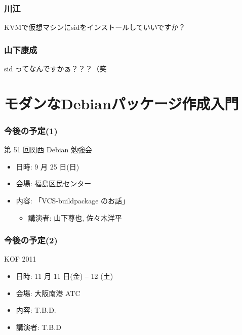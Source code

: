 \documentclass[cjk,dvipdfmx,12pt,%
hyperref={bookmarks=true,bookmarksnumbered=true,bookmarksopen=false,%
colorlinks=false,%
pdftitle={第 50 回 関西 Debian 勉強会},%
pdfauthor={倉敷・のがた・佐々木},%
pdfsubject={資料},%
}]{beamer}
\begin{document}
\begin{frame}[fragile]
\frametitle{ 川江 }
KVMで仮想マシンにsidをインストールしていいですか？
\end{frame}

\begin{frame}[fragile]
\frametitle{ 山下康成 }
sid ってなんですかぁ？？？（笑
\end{frame}



\section{モダンなDebianパッケージ作成入門}


\begin{frame}[fragile]
\frametitle{今後の予定(1)}

\begin{block}{第 51 回関西 Debian 勉強会}
  \begin{itemize}
  \item 日時: 9 月 25 日(日)
  \item 会場: 福島区民センター
  \item 内容: 「VCS-buildpackage のお話」
    \begin{itemize}
    \item 講演者: 山下尊也, 佐々木洋平
    \end{itemize}
  \end{itemize}
\end{block}

\end{frame}

\begin{frame}[fragile]
\frametitle{今後の予定(2)}

\begin{block}{KOF 2011}
  \begin{itemize}
  \item 日時: 11 月 11 日(金) -- 12 (土)
  \item 会場: 大阪南港 ATC
  \item 内容: T.B.D.
  \item 講演者: T.B.D
  \end{itemize}
\end{block}

\end{frame}


\takahashi[50]{  }
\end{document}
